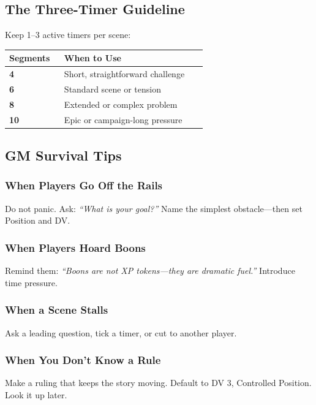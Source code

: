 \documentclass[10pt,twocolumn]{article} %
\begin{document}
\subsection{The Three-Timer Guideline}
Keep 1–3 active timers per scene:
\begin{coretable}
\begin{tabular}{>{\bfseries}p{0.25\linewidth} p{0.65\linewidth}}
\toprule
\textbf{Segments} & \textbf{When to Use} \\
\midrule
4 & Short, straightforward challenge \\
6 & Standard scene or tension \\
8 & Extended or complex problem \\
10 & Epic or campaign-long pressure \\
\bottomrule
\end{tabular}
\end{coretable}

\subsection{GM Survival Tips}
\subsubsection{When Players Go Off the Rails}
Do not panic. Ask: \textit{``What is your goal?''} Name the simplest obstacle—then set Position and DV.

\subsubsection{When Players Hoard Boons}
Remind them: \textit{``Boons are not XP tokens—they are dramatic fuel.''} Introduce time pressure.

\subsubsection{When a Scene Stalls}
Ask a leading question, tick a timer, or cut to another player.

\subsubsection{When You Don't Know a Rule}
Make a ruling that keeps the story moving. Default to DV 3, Controlled Position. Look it up later.

\end{document}
